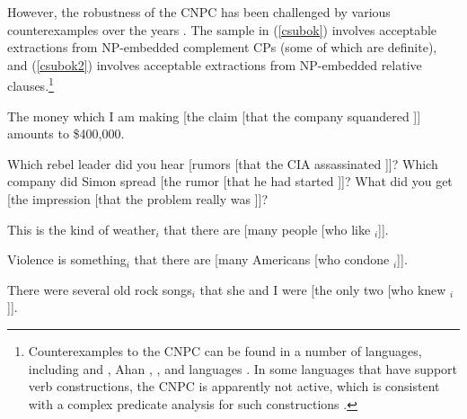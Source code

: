 \documentclass[output=paper
 	        ,biblatex
                ,babelshorthands
                ,newtxmath
                ,draftmode
                ,colorlinks, citecolor=brown
]{langscibook}
\begin{document}
\z 


However, the robustness of the CNPC  has been challenged by various
counterexamples over the years \citep{Ross67,pollardsag,kluender,postal98,saghof}.
The sample in (\ref{csubok}) involves acceptable
extractions from NP-embedded complement CPs (some of which are definite),
 and (\ref{csubok2}) involves acceptable extractions from NP-embedded relative clauses.\footnote{Counterexamples to  the CNPC can be found in a number of languages, 
including  and   \citep{kunojap,Nishigauchi99},  Ahan \citep{saah},    \citep[Chapter 2]{shir},   \citep{allwood,engdahl82}   \citep{taraldsen82} and  languages \citep{Cinque10}.  In some languages that have support verb constructions, the CNPC is apparently 
 not active, which is consistent with a complex predicate analysis 
 for such constructions \citet{vives}.}



\eal
 \label{csubok}
\ex The money which I am making [the claim [that the company squandered \spc]] amounts to \$400,000.\\
 \citep[206, 207]{pollardsag}

\ex  Which rebel leader did you hear [rumors [that the CIA assassinated \spc]]?
\ex Which company did Simon spread [the rumor [that he had started \spc]]?
\ex What did you get [the impression [that the problem really was \spc]]?\\
\citep{kluender}
\zl

\eal \label{csubok2}
\ex This is the kind of weather$_i$ that there are [many people [who like \spc$_i$]].\\
\citep{shirlappin}

\ex Violence is something$_i$ that there are [many Americans [who condone \spc$_i$]].\\
\citep[108]{mccawley81}

\ex There were several old rock songs$_i$ that she and I were [the only two [who
knew \spc$_i$]].\\
\citep{chungmc}
\end{document}
